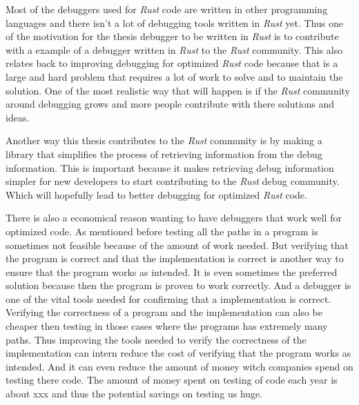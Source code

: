 Most of the debuggers used for \emph{Rust} code are written in other programming languages and there isn't a lot of debugging tools written in \emph{Rust} yet.
Thus one of the motivation for the thesis debugger to be written in \emph{Rust} is to contribute with a example of a debugger written in \emph{Rust} to the \emph{Rust} community.
This also relates back to improving debugging for optimized \emph{Rust} code because that is a large and hard problem that requires a lot of work to solve and to maintain the solution.
One of the most realistic way that will happen is if the \emph{Rust} community around debugging grows and more people contribute with there solutions and ideas.


Another way this thesis contributes to the \emph{Rust} community is by making a library that simplifies the process of retrieving information from the debug information.
This is important because it makes retrieving debug information simpler for new developers to start contributing to the \emph{Rust} debug community.
Which will hopefully lead to better debugging for optimized \emph{Rust} code.


There is also a economical reason wanting to have debuggers that work well for optimized code.
As mentioned before testing all the paths in a program is sometimes not feasible because of the amount of work needed.
But verifying that the program is correct and that the implementation is correct is another way to ensure that the program works as intended.
It is even sometimes the preferred solution because then the program is proven to work correctly.
And a debugger is one of the vital tools needed for confirming that a implementation is correct.
Verifying the correctness of a program and the implementation can also be cheaper then testing in those cases where the programs has extremely many paths.
Thus improving the tools needed to verify the correctness of the implementation can intern reduce the cost of verifying that the program works as intended.
And it can even reduce the amount of money witch companies spend on testing there code.
The amount of money spent on testing of code each year is about xxx and thus the potential savings on testing us huge. %


